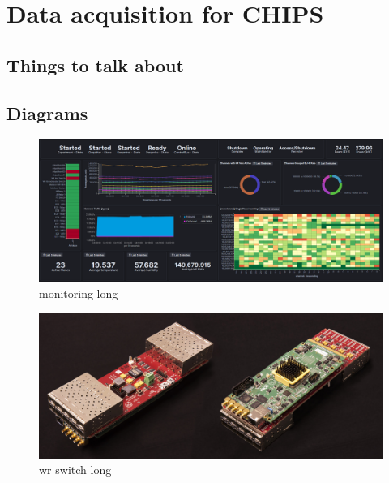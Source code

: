 \chapter{Data acquisition for CHIPS}
\label{chap:daq}


\section{Things to talk about}


\section{Diagrams}

\begin{figure}
    \includegraphics[width=\textwidth]{diagrams/5-daq/monitoring.png}
    \caption[monitoring short]{monitoring long}
    \label{fig:monitoring}
\end{figure}

\begin{figure}
    \includegraphics[width=\textwidth]{diagrams/5-daq/wr_switch.jpg}
    \caption[wr switch short]{wr switch long}
    \label{fig:wr_switch}
\end{figure}


